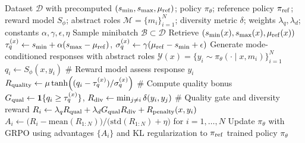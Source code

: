 \begin{algorithm}
\caption{\textsc{MoDA}: \textbf{Mo}de-Conditioned \textbf{D}iversity \textbf{A}lignment }
\label{alg: moda-stage2}
\small
\begin{algorithmic}[1]
\Require Dataset $\mathcal{D}$ with precomputed $(s_{\min},s_{\max},\mu_{\rm ref})$; policy $\pi_\theta$; reference policy $\pi_{\rm ref}$; reward model $S_\phi$; abstract roles $\mathcal{M}=\{m_i\}_{i=1}^N$; diversity metric $\delta$; weights $\lambda_q,\lambda_d$; constants $\alpha,\gamma,\epsilon,\eta$
    \State Sample minibatch $\mathcal{B}\subset\mathcal{D}$
        \State Retrieve $(s_{\min}(x),s_{\max}(x),\mu_{\rm ref}(x))$
        \State $\tau_q^{(x)}\gets s_{\min}+\alpha(s_{\max}-\mu_{\rm ref})$,\quad
        $ \sigma_q^{(x)}\gets \gamma(\mu_{\rm ref}-s_{\min}+\epsilon)$
        \State Generate mode-conditioned responses with abstract roles
        $\mathcal{Y}(x)=\{y_i\sim\pi_\theta(\cdot\mid x,m_i)\}_{i=1}^N$
            \State $q_i\gets S_\phi(x,y_i)$ \quad \# Reward model assess response $y_i$
            \quad
            \State $R_{\rm quality}\gets \mu\tanh\!\left((q_i- \tau_q^{(x)})/ \sigma_q^{(x)}\right)$ \quad \# Compute quality bonus
            \State $G_{\rm qual}\gets \mathbf{1}\{q_i\ge  \tau_q^{(x)}\}$,\quad
            $R_{\rm div}\gets \min_{j\ne i}\delta(y_i,y_j)$ \# Quality gate and diversity reward
            \State $R_i\gets \lambda_q R_{\rm qual}
            +\lambda_d G_{\rm qual}R_{\rm div}
            +R_{\rm penalty}(x,y_i)$
        \EndFor
        \State $A_i\gets \bigl(R_i-\mathrm{mean}(R_{1:N})\bigr)/
        \bigl(\mathrm{std}(R_{1:N})+\eta\bigr)$ for $i=1,\ldots,N$
    \EndFor
    \State Update $\pi_\theta$ with GRPO using advantages $\{A_i\}$ and KL regularization to $\pi_{\rm ref}$
\EndFor
\State \Return trained policy $\pi_\theta$
\end{algorithmic}
\label{alg: moda short}
\end{algorithm}



